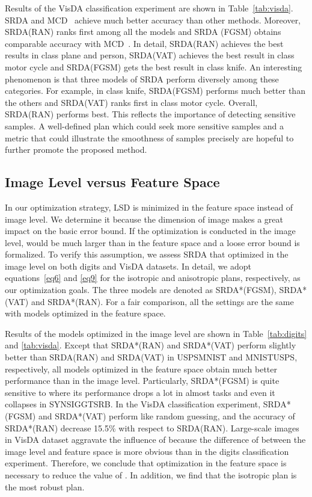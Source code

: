 \documentclass[10pt,twocolumn,letterpaper]{article}
\begin{document}
Results of the VisDA classification experiment are shown in Table~\ref{tab:visda}. SRDA and MCD~\cite{saito2018maximum} achieve much better accuracy than other methods. Moreover, SRDA(RAN) ranks first among all the models and SRDA (FGSM) obtains comparable accuracy with MCD~\cite{saito2018maximum}. In detail, SRDA(RAN) achieves the best results in class plane and person, SRDA(VAT) achieves the best result in class motor cycle and SRDA(FGSM) gets the best result in class knife. An interesting phenomenon is that three models of SRDA perform diversely among these categories. For example, in class knife, SRDA(FGSM) performs much better than the others and SRDA(VAT) ranks first in class motor cycle. Overall, SRDA(RAN) performs best. This reflects the importance of detecting sensitive samples. A well-defined plan which could seek more sensitive samples and a metric that could illustrate the smoothness of samples precisely are hopeful to further promote the proposed method.

\subsection{Image Level versus Feature Space}

In our optimization strategy, LSD is minimized in the feature space instead of image level. We determine it because the dimension of image  makes a great impact on the basic error bound. If the optimization is conducted in the image level,  would be much larger than in the feature space and a loose error bound is formalized. To verify this assumption, we assess SRDA that optimized in the image level on both digits and VisDA datasets. In detail, we adopt equations~\ref{eq6} and \ref{eq9} for the isotropic and anisotropic plans, respectively, as our optimization goals. The three models are denoted as SRDA*(FGSM), SRDA*(VAT) and SRDA*(RAN). For a fair comparison, all the settings are the same with models optimized in the feature space.

Results of the models optimized in the image level are shown in Table~\ref{tab:digits} and \ref{tab:visda}. Except that SRDA*(RAN) and SRDA*(VAT) perform slightly better than SRDA(RAN) and SRDA(VAT) in USPSMNIST and MNISTUSPS, respectively, all models optimized in the feature space obtain much better performance than in the image level. Particularly, SRDA*(FGSM) is quite sensitive to  where its performance drops a lot in almost tasks and even it collapses in SYNSIGGTSRB. In the VisDA classification experiment, SRDA*(FGSM) and SRDA*(VAT) perform like random guessing, and the accuracy of SRDA*(RAN) decrease 15.5\% with respect to SRDA(RAN). Large-scale images in VisDA dataset aggravate the influence of  because the difference of  between the image level and feature space is more obvious than in the digits classification experiment. Therefore, we conclude that optimization in the feature space is necessary to reduce the value of . In addition, we find that the isotropic plan is the most robust plan.
\end{document}
